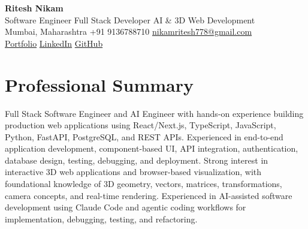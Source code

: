 \documentclass[a4paper,10pt]{article}
\begin{document}
\begin{center}
  {\LARGE\bfseries Ritesh Nikam} \\[5pt]
  {\normalsize Software Engineer \textbar{} Full Stack Developer \textbar{} AI \& 3D Web Development} \\[6pt]
  {\small\color{MutedText}
    Mumbai, Maharashtra \textbar{}
    +91 9136788710 \textbar{}
    \href{https://mail.google.com/mail/?view=cm\&fs=1\&to=nikamritesh778@gmail.com}{nikamritesh778@gmail.com} \\[3pt]
    \href{https://ritesshnikam.vercel.app/}{Portfolio} \textbar{}
    \href{https://www.linkedin.com/in/ritessh-nikam}{LinkedIn} \textbar{}
    \href{https://github.com/nikamritessh}{GitHub}
  }
\end{center}

\section{Professional Summary}
\small
Full Stack Software Engineer and AI Engineer with hands-on experience building production web applications using React/Next.js, TypeScript, JavaScript, Python, FastAPI, PostgreSQL, and REST APIs. Experienced in end-to-end application development, component-based UI, API integration, authentication, database design, testing, debugging, and deployment. Strong interest in interactive 3D web applications and browser-based visualization, with foundational knowledge of 3D geometry, vectors, matrices, transformations, camera concepts, and real-time rendering. Experienced in AI-assisted software development using Claude Code and agentic coding workflows for implementation, debugging, testing, and refactoring.

\end{document}
